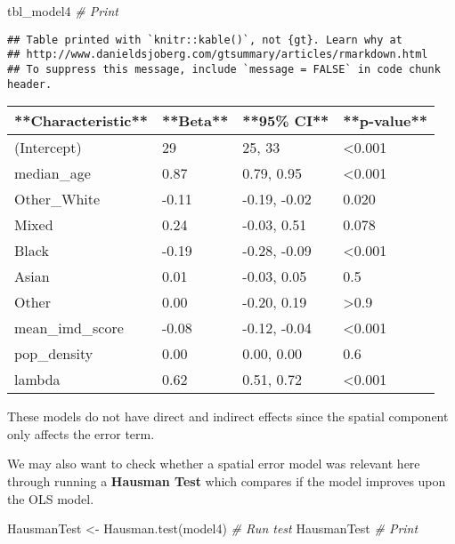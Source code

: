 \documentclass[
]{book}
\newenvironment{Shaded}{\begin{snugshade}}{\end{snugshade}}
\newcommand{\CommentTok}[1]{\textcolor[rgb]{0.56,0.35,0.01}{\textit{#1}}}
\newcommand{\FunctionTok}[1]{\textcolor[rgb]{0.00,0.00,0.00}{#1}}
\newcommand{\NormalTok}[1]{#1}
\newcommand{\OtherTok}[1]{\textcolor[rgb]{0.56,0.35,0.01}{#1}}
\begin{document}
\begin{Shaded}
\begin{Highlighting}[]
\NormalTok{tbl\_model4 }\CommentTok{\# Print}
\end{Highlighting}
\end{Shaded}

\begin{verbatim}
## Table printed with `knitr::kable()`, not {gt}. Learn why at
## http://www.danieldsjoberg.com/gtsummary/articles/rmarkdown.html
## To suppress this message, include `message = FALSE` in code chunk header.
\end{verbatim}

\begin{tabular}{l|l|l|l}
\hline
**Characteristic** & **Beta** & **95\% CI** & **p-value**\\
\hline
(Intercept) & 29 & 25, 33 & <0.001\\
\hline
median\_age & 0.87 & 0.79, 0.95 & <0.001\\
\hline
Other\_White & -0.11 & -0.19, -0.02 & 0.020\\
\hline
Mixed & 0.24 & -0.03, 0.51 & 0.078\\
\hline
Black & -0.19 & -0.28, -0.09 & <0.001\\
\hline
Asian & 0.01 & -0.03, 0.05 & 0.5\\
\hline
Other & 0.00 & -0.20, 0.19 & >0.9\\
\hline
mean\_imd\_score & -0.08 & -0.12, -0.04 & <0.001\\
\hline
pop\_density & 0.00 & 0.00, 0.00 & 0.6\\
\hline
lambda & 0.62 & 0.51, 0.72 & <0.001\\
\hline
\end{tabular}

These models do not have direct and indirect effects since the spatial component only affects the error term.

We may also want to check whether a spatial error model was relevant here through running a \textbf{Hausman Test} which compares if the model improves upon the OLS model.

\begin{Shaded}
\begin{Highlighting}[]
\NormalTok{HausmanTest }\OtherTok{\textless{}{-}} \FunctionTok{Hausman.test}\NormalTok{(model4) }\CommentTok{\# Run test}
\NormalTok{HausmanTest }\CommentTok{\# Print}
\end{Highlighting}
\end{Shaded}
\end{document}
